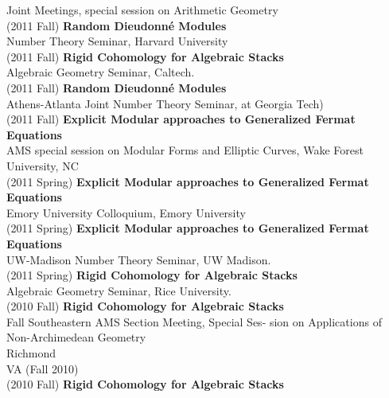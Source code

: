 \documentclass[margin,line]{res}
\begin{document}
\begin{resume}
Joint Meetings, special session on Arithmetic Geometry
\vspace{.05cm}\\
(2011 Fall) \textbf{Random Dieudonn\'e Modules}\\
Number Theory Seminar, Harvard University
\vspace{.05cm}\\
(2011 Fall) \textbf{Rigid Cohomology for Algebraic Stacks}\\
Algebraic Geometry Seminar, Caltech.
\vspace{.05cm}\\
(2011 Fall) \textbf{Random Dieudonn\'e Modules}\\
Athens-Atlanta Joint Number Theory Seminar, at Georgia Tech)
\vspace{.05cm}\\
(2011 Fall) \textbf{Explicit Modular approaches to Generalized Fermat Equations}\\
AMS special session on Modular Forms and Elliptic Curves, Wake Forest University, NC
\vspace{.05cm}\\
(2011 Spring) \textbf{Explicit Modular approaches to Generalized Fermat Equations}\\
Emory University Colloquium, Emory University
\vspace{.05cm}\\
(2011 Spring) \textbf{Explicit Modular approaches to Generalized Fermat Equations}\\
 UW-Madison Number Theory Seminar, UW Madison.
\vspace{.05cm}\\
(2011 Spring) \textbf{Rigid Cohomology for Algebraic Stacks}\\
Algebraic Geometry Seminar, Rice University.
\vspace{.05cm}\\
(2010 Fall) \textbf{Rigid Cohomology for Algebraic Stacks}\\
Fall Southeastern AMS Section Meeting, Special Ses-
sion on Applications of Non-Archimedean Geometry\\ Richmond\\ VA (Fall 2010)
\vspace{.05cm}\\
(2010 Fall) \textbf{Rigid Cohomology for Algebraic Stacks}\\

\end{resume}
\end{document}
